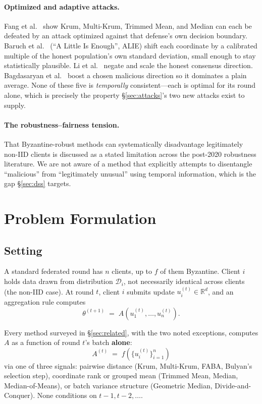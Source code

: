 \documentclass[11pt,a4paper]{article}
\begin{document}
\paragraph{Optimized and adaptive attacks.}
Fang et al.~\cite{fang2020} show Krum, Multi-Krum, Trimmed Mean, and
Median can each be defeated by an attack optimized against that defense's
own decision boundary. Baruch et al.~\cite{baruch2019} (``A Little Is
Enough'', ALIE) shift each coordinate by a calibrated multiple of the
honest population's own standard deviation, small enough to stay
statistically plausible. Li et al.~\cite{li2019} negate and scale the
honest consensus direction. Bagdasaryan et al.~\cite{bagdasaryan2020}
boost a chosen malicious direction so it dominates a plain average. None
of these five is \emph{temporally} consistent---each is optimal for its
round alone, which is precisely the property \S\ref{sec:attacks}'s two new
attacks exist to supply.

\paragraph{The robustness--fairness tension.}
That Byzantine-robust methods can systematically disadvantage
legitimately non-IID clients is discussed as a stated limitation across
the post-2020 robustness literature. We are not aware of a method that
explicitly attempts to disentangle ``malicious'' from ``legitimately
unusual'' using temporal information, which is the gap
\S\ref{sec:dss} targets.

\section{Problem Formulation}
\label{sec:problem}

\subsection{Setting}

A standard federated round has $n$ clients, up to $f$ of them Byzantine.
Client $i$ holds data drawn from distribution $\mathcal{D}_i$, not
necessarily identical across clients (the non-IID case). At round $t$,
client $i$ submits update $u_i^{(t)} \in \mathbb{R}^d$, and an
aggregation rule computes
\[
  \theta^{(t+1)} \;=\; A\!\left(u_1^{(t)}, \dots, u_n^{(t)}\right).
\]

Every method surveyed in \S\ref{sec:related}, with the two noted
exceptions, computes $A$ as a function of round $t$'s batch \textbf{alone}:
\begin{equation}
  A^{(t)} \;=\; f\!\left(\{u_i^{(t)}\}_{i=1}^{n}\right)
  \label{eq:singleround}
\end{equation}
via one of three signals: pairwise distance (Krum, Multi-Krum, FABA,
Bulyan's selection step), coordinate rank or grouped mean (Trimmed Mean,
Median, Median-of-Means), or batch variance structure (Geometric Median,
Divide-and-Conquer). None conditions on $t-1, t-2, \dots$.
\end{document}
